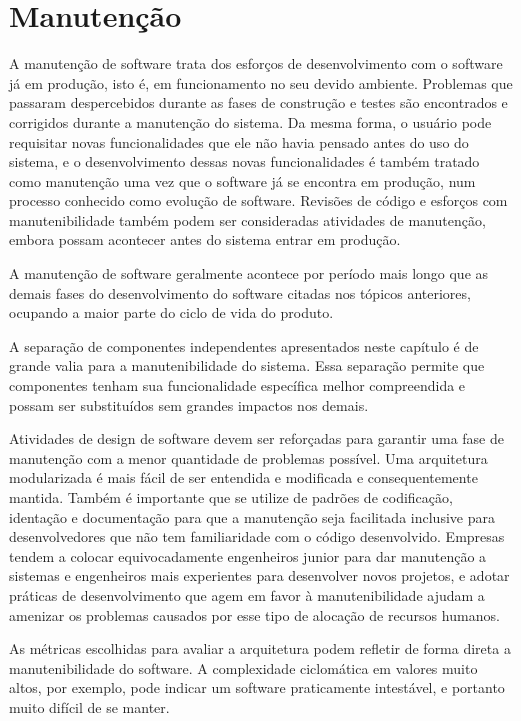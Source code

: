 \section{Manutenção}

A manutenção de software trata dos esforços de desenvolvimento com o software já em produção, isto é, em funcionamento no seu devido ambiente. Problemas que passaram despercebidos durante as fases de construção e testes são encontrados e corrigidos durante a manutenção do sistema. Da mesma forma, o usuário pode requisitar novas funcionalidades que ele não havia pensado antes do uso do sistema, e o desenvolvimento dessas novas funcionalidades é também tratado como manutenção uma vez que o software já se encontra em produção, num processo conhecido como evolução de software. Revisões de código e esforços com manutenibilidade também podem ser consideradas atividades de manutenção, embora possam acontecer antes do sistema entrar em produção.

A manutenção de software geralmente acontece por período mais longo que as demais fases do desenvolvimento do software citadas nos tópicos anteriores, ocupando a maior parte do ciclo de vida do produto.

A separação de componentes independentes apresentados neste capítulo é de grande valia para a manutenibilidade do sistema. Essa separação permite que componentes tenham sua funcionalidade específica melhor compreendida e possam ser substituídos sem grandes impactos nos demais. 

Atividades de design de software devem ser reforçadas para garantir uma fase de manutenção com a menor quantidade de problemas possível. Uma arquitetura modularizada é mais fácil de ser entendida e modificada e consequentemente mantida. Também é importante que se utilize de padrões de codificação, identação e documentação para que a manutenção seja facilitada inclusive para desenvolvedores que não tem familiaridade com o código desenvolvido. Empresas tendem a colocar equivocadamente engenheiros junior para dar manutenção a sistemas e engenheiros mais experientes para desenvolver novos projetos, e adotar práticas de desenvolvimento que agem em favor à manutenibilidade ajudam a amenizar os problemas causados por esse tipo de alocação de recursos humanos.

As métricas escolhidas para avaliar a arquitetura podem refletir de forma direta a manutenibilidade do software. A complexidade ciclomática em valores muito altos, por exemplo, pode indicar um software praticamente intestável, e portanto muito difícil de se manter.

